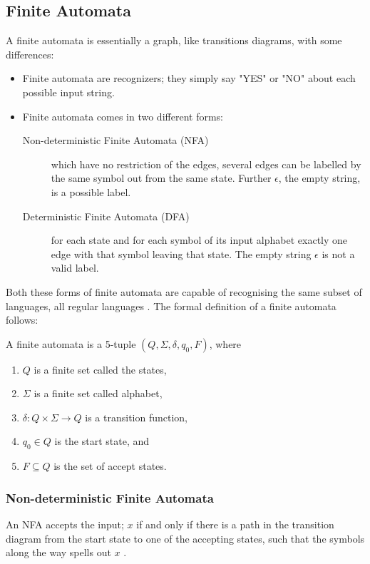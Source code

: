 \subsection{Finite Automata}
A finite automata is essentially a graph, like transitions diagrams, with some 
differences:
\begin{itemize}
  \item Finite automata are recognizers; they simply say "YES" or "NO" about 
each possible input string.
  \item Finite automata comes in two different forms:
    \begin{description}
      \item [Non-deterministic Finite Automata (NFA)] which have no restriction 
of the edges, several edges can be labelled by the same symbol out from the 
same state. Further $\epsilon$, the empty string, is a possible label. 
      \item [Deterministic Finite Automata (DFA)] for each state and for each 
symbol of its input alphabet exactly one edge with that symbol leaving that 
state. The empty string $\epsilon$ is not a valid label.
    \end{description}
\end{itemize}
Both these forms of finite automata are capable of recognising the same 
subset of languages, all regular languages \cite{Aho2006}.
The formal definition of a finite automata follows:
\begin{definition} \label{finiteAutomataDef}
A finite automata is a 5-tuple $(Q, \Sigma, \delta, q_0, F)$, where
\begin{enumerate}
  \item $Q$ is a finite set called the states,
  \item $\Sigma$ is a finite set called alphabet,
  \item $\delta: Q \times \Sigma \to Q$ is a transition function,
  \item $q_0 \in Q$ is the start state, and
  \item $F \subseteq Q$ is the set of accept states.
\end{enumerate}

\end{definition}
\subsubsection{Non-deterministic Finite Automata}
An NFA accepts the input; $x$ if and only if there is a path in the transition 
diagram from the start state to one of the accepting states, such that the 
symbols along the way spells out $x$ \cite{Aho2006}.

